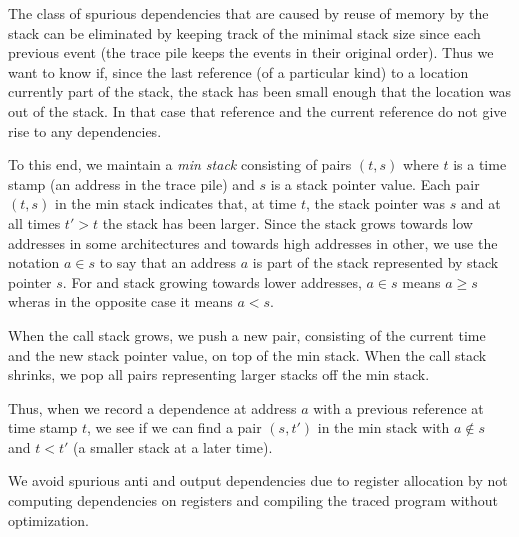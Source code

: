 The class of spurious dependencies that are caused by reuse of memory 
by the stack can be eliminated by keeping track of the minimal stack
size since each previous event (the trace pile keeps the events in their
original order). Thus we want to know if, since the last reference (of a 
particular kind) to a location currently part of the stack, the stack 
has been small enough that the location was out of the stack. In that
case that reference and the current reference do not give rise to any 
dependencies.

To this end, we maintain a {\em min stack} consisting of pairs $(t,s)$
where $t$ is a time stamp (an address in the trace pile) and $s$ is a 
stack pointer value. Each pair
$(t,s)$ in the min stack indicates that, at time $t$, the stack
pointer was $s$ and at all times $t'>t$ the stack has been larger.
Since the stack grows towards low addresses in some architectures and 
towards high addresses in other, we use the notation $a \in s$ to say 
that an address $a$ is part of the stack represented by stack pointer $s$.
For and stack growing towards lower addresses, $a\in s$ means $a \geq s$
wheras in the opposite case it means $a<s$.

When the
call stack grows, we push a new pair, consisting of the current time
and the new stack pointer value, on top of the min stack. When the
call stack shrinks, we pop all pairs representing larger stacks off the min
stack.

Thus, when we record a dependence at address $a$ with a previous 
reference at time stamp $t$,
we see if we can find a pair $(s,t')$ in the min stack with $a \not\in s$ and
$t<t'$ (a smaller stack at a later time).

We avoid spurious anti and output dependencies due to register
allocation by not computing dependencies on registers and compiling
the traced program without optimization. 
